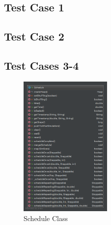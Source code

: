 \documentclass[11pt]{article}
\begin{document}
\subsection{Test Case 1}

\subsection{Test Case 2}

\subsection{Test Cases 3-4}
\begin{figure} 
	\vspace{-25pt}
	\begin{center}
		\includegraphics[width=0.4\textwidth]{Appendix/Schedule}
		\caption{Schedule Class}
		\label{fig:schedule}
	\end{center}
\end{figure}
\end{document}
